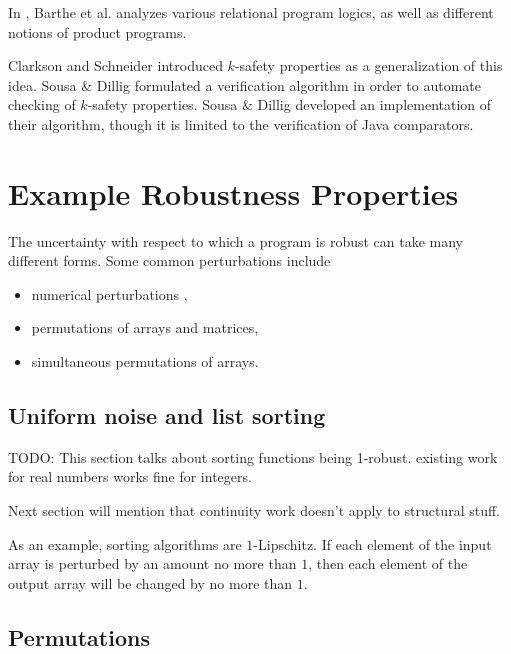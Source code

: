 \documentclass{llncs}
\DeclareMathOperator{\Perm}{Perm}
\DeclareMathOperator{\len}{length}
\begin{document}
    In \cite{bartheanalysis}, Barthe et al.
    analyzes various relational program logics, as well as different notions of
    product programs.

    \space\space Clarkson and Schneider
    \cite{clarkson08} introduced \(k\)-safety properties as a generalization of this
    idea.  Sousa \& Dillig \cite{sousa16} formulated a verification algorithm in
    order to automate checking of \(k\)-safety properties.  Sousa \& Dillig developed
    an implementation of their algorithm, though it is limited to the verification
    of Java comparators.

\section{Example Robustness Properties}

  The uncertainty with respect to which a program is robust can take many
  different forms.  Some common perturbations include
  \begin{itemize}
    \item numerical perturbations \cite{samanta14,chaudhuri10,chaudhuri11},
    \item permutations of arrays and matrices,
    \item simultaneous permutations of arrays.
  \end{itemize}

  \subsection{Uniform noise and list sorting}

    TODO: This section talks about sorting functions being 1-robust. existing
    work for real numbers works fine for integers.

    Next section will mention that continuity work doesn't apply to structural
    stuff.

    As an example, sorting algorithms are
    \(1\)-Lipschitz.  If each element of the input array is perturbed by an amount
    no more than \(1\), then each element of the output array will be changed by no
    more than \(1\).

  \subsection{Permutations}

\end{document}

